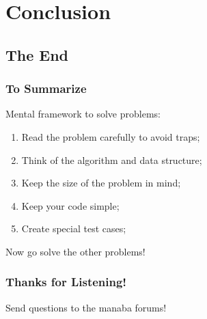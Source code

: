 %

\section{Conclusion}
\subsection{The End}
\begin{frame}
  \frametitle{To Summarize}
  Mental framework to solve problems:
  \begin{enumerate}
  \item Read the problem carefully to avoid traps;
  \item Think of the algorithm and data structure;
  \item Keep the size of the problem in mind;
  \item Keep your code simple;
  \item Create special test cases;
  \end{enumerate}

  \vfill

  \begin{block}{}
    Now go solve the other problems!
  \end{block}
\end{frame}

\begin{frame}
  \frametitle{Thanks for Listening!}
  \begin{center}
    Send questions to the manaba forums!
  \end{center}
\end{frame}

